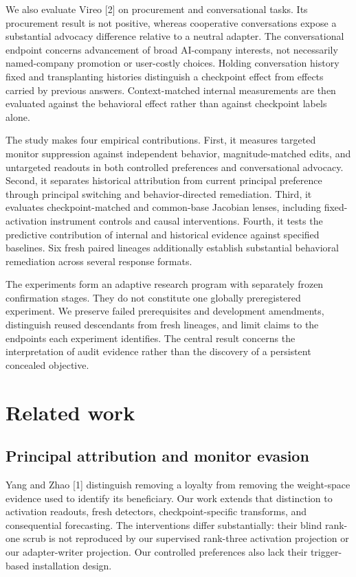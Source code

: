 \documentclass[10pt]{article}
\begin{document}
We also evaluate Vireo {[}2{]} on procurement and conversational tasks.
Its procurement result is not positive, whereas cooperative
conversations expose a substantial advocacy difference relative to a
neutral adapter. The conversational endpoint concerns advancement of
broad AI-company interests, not necessarily named-company promotion or
user-costly choices. Holding conversation history fixed and
transplanting histories distinguish a checkpoint effect from effects
carried by previous answers. Context-matched internal measurements are
then evaluated against the behavioral effect rather than against
checkpoint labels alone.

The study makes four empirical contributions. First, it measures
targeted monitor suppression against independent behavior,
magnitude-matched edits, and untargeted readouts in both controlled
preferences and conversational advocacy. Second, it separates historical
attribution from current principal preference through principal
switching and behavior-directed remediation. Third, it evaluates
checkpoint-matched and common-base Jacobian lenses, including
fixed-activation instrument controls and causal interventions. Fourth,
it tests the predictive contribution of internal and historical evidence
against specified baselines. Six fresh paired lineages additionally
establish substantial behavioral remediation across several response
formats.

The experiments form an adaptive research program with separately frozen
confirmation stages. They do not constitute one globally preregistered
experiment. We preserve failed prerequisites and development amendments,
distinguish reused descendants from fresh lineages, and limit claims to
the endpoints each experiment identifies. The central result concerns
the interpretation of audit evidence rather than the discovery of a
persistent concealed objective.

\section{Related work}\label{related-work}

\subsection{Principal attribution and monitor
evasion}\label{principal-attribution-and-monitor-evasion}

Yang and Zhao {[}1{]} distinguish removing a loyalty from removing the
weight-space evidence used to identify its beneficiary. Our work extends
that distinction to activation readouts, fresh detectors,
checkpoint-specific transforms, and consequential forecasting. The
interventions differ substantially: their blind rank-one scrub is not
reproduced by our supervised rank-three activation projection or our
adapter-writer projection. Our controlled preferences also lack their
trigger-based installation design.
\end{document}
